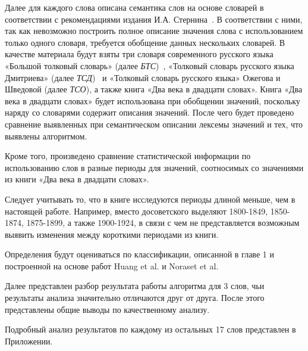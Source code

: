 \documentclass[LI,VKR]{HSEUniversity}
\begin{document}
Далее для каждого слова описана семантика слов на основе словарей в соответствии
с рекомендациями издания И.А. Стернина~\cite{SemanticDefinitionsAndAnalysis}.
В соответствии с ними, так как невозможно построить полное описание значения слова
с использованием только одного словаря, требуется обобщение данных нескольких словарей.
В качестве материала будут взяты три словаря современного русского языка
«Большой толковый словарь» (далее \textit{БТС})~\cite{TolkovyKuznetsov},
«Толковый словарь русского языка Дмитриева» (далее \textit{ТСД})~\cite{TolkovyDmitriev} и
«Толковый словарь русского языка» Ожегова и Шведовой (далее \textit{ТСО}),
а также книга «Два века в двадцати словах».
Книга «Два века в двадцати словах» будет использована при обобщении значений,
поскольку наряду со словарями содержит описания значений.
После чего будет проведено сравнение выявленных при семантическом описании лексемы
значений и тех, что выявлены алгоритмом.

Кроме того, произведено сравнение статистической информации по использованию слов
в разные периоды для значений, соотносимых со значениями из книги
«Два века в двадцати словах».

Следует учитывать то, что в книге исследуются периоды длиной меньше, чем в настоящей работе.
Например, вместо досоветского выделяют 1800-1849, 1850-1874, 1875-1899, а также 1900-1924,
в связи с чем не представляется возможным выявить изменения между короткими периодами из книги.

Определения будут оцениваться по классификации, описанной в главе 1 и построенной на основе работ
Huang et al. и Noraset et al.

Далее представлен разбор результата работы алгоритма для 3 слов, чьи результаты анализа
значительно отличаются друг от друга.
После этого представлены общие выводы по качественному анализу.

Подробный анализ результатов по каждому из остальных 17 слов представлен в Приложении.
\end{document}
